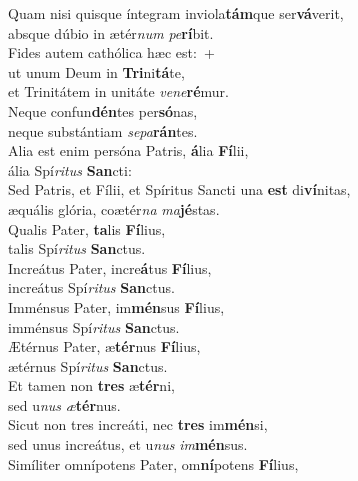 \evenverse Quam nisi quisque íntegram inviola\textbf{tám}que ser\textbf{vá}verit,~\*\\
\evenverse absque dúbio in ætér\textit{num} \textit{pe}\textbf{rí}bit.\\
\oddverse Fides autem cathólica hæc est:~+\\
\oddverse  ut unum Deum in \textbf{Tri}ni\textbf{tá}te,~\*\\
\oddverse et Trinitátem in unitáte \textit{ve}\textit{ne}\textbf{ré}mur.\\
\evenverse Neque confun\textbf{dén}tes per\textbf{só}nas,~\*\\
\evenverse neque substántiam \textit{se}\textit{pa}\textbf{rán}tes.\\
\oddverse Alia est enim persóna Patris, \textbf{á}lia \textbf{Fí}lii,~\*\\
\oddverse ália Spí\textit{ri}\textit{tus} \textbf{San}cti:\\
\evenverse Sed Patris, et Fílii, et Spíritus Sancti una \textbf{est} di\textbf{ví}nitas,~\*\\
\evenverse æquális glória, coætér\textit{na} \textit{ma}\textbf{jé}stas.\\
\oddverse Qualis Pater, \textbf{ta}lis \textbf{Fí}lius,~\*\\
\oddverse talis Spí\textit{ri}\textit{tus} \textbf{San}ctus.\\
\evenverse Increátus Pater, incre\textbf{á}tus \textbf{Fí}lius,~\*\\
\evenverse increátus Spí\textit{ri}\textit{tus} \textbf{San}ctus.\\
\oddverse Imménsus Pater, im\textbf{mén}sus \textbf{Fí}lius,~\*\\
\oddverse imménsus Spí\textit{ri}\textit{tus} \textbf{San}ctus.\\
\evenverse Ætérnus Pater, æ\textbf{tér}nus \textbf{Fí}lius,~\*\\
\evenverse ætérnus Spí\textit{ri}\textit{tus} \textbf{San}ctus.\\
\oddverse Et tamen non \textbf{tres} æ\textbf{tér}ni,~\*\\
\oddverse sed u\textit{nus} \textit{æ}\textbf{tér}nus.\\
\evenverse Sicut non tres increáti, nec \textbf{tres} im\textbf{mén}si,~\*\\
\evenverse sed unus increátus, et u\textit{nus} \textit{im}\textbf{mén}sus.\\
\oddverse Simíliter omnípotens Pater, om\textbf{ní}potens \textbf{Fí}lius,~\*\\
